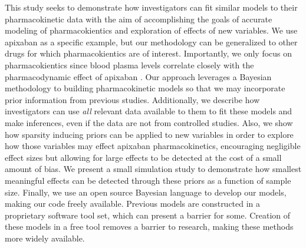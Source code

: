 This study seeks to demonstrate how investigators can fit similar models to their pharmacokinetic data with the aim of accomplishing the goals of accurate modeling of pharmacokientics and exploration of effects of new variables.  We use apixaban as a specific example, but our methodology can be generalized to other drugs for which pharmacokientics are of interest.  Importantly, we only focus on pharmacokientics since blood plasma levels correlate closely with the pharmacodynamic effect of apixaban \cite{byon2019apixaban, upreti2013effect, frost2013safety,frost2013apixaban}. Our approach leverages a Bayesian methodology to building pharmacokinetic models so that we may incorporate prior information from previous studies. Additionally, we describe how investigators can use \textit{all} relevant data available to them to fit these models and make inferences, even if the data are not from controlled studies.  Also, we show how sparsity inducing priors can be applied to new variables in order to explore how those variables may effect apixaban pharmacokinetics, encouraging negligible effect sizes but allowing for large effects to be detected at the cost of a small amount of bias. We present a small simulation study to demonstrate how smallest meaningful effects can be detected through these priors as a function of sample size. Finally, we use an open source Bayesian language to develop our models, making our code freely available.  Previous models are constructed in a proprietary software tool set, which can present a barrier for some. Creation of these models in a free tool removes a barrier to research, making these methods more widely available.
